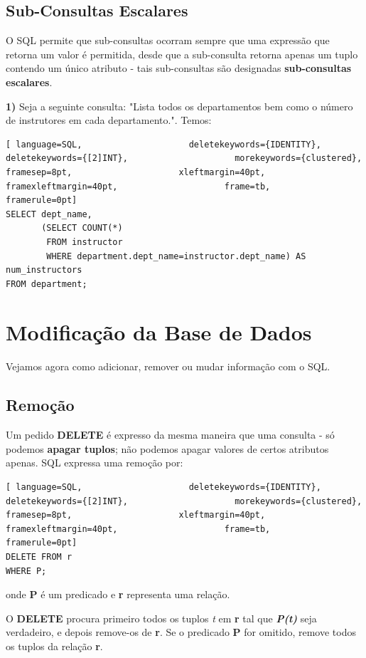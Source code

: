 \documentclass[titlepage]{book}
\theoremstyle{definition}
\begin{document}
\subsection{Sub-Consultas Escalares}
O SQL permite que sub-consultas ocorram sempre que uma expressão que retorna um valor é permitida, desde que a sub-consulta retorna apenas um tuplo contendo um único atributo - tais sub-consultas são designadas \textbf{sub-consultas escalares}.

\textbf{1)} Seja a seguinte consulta: "Lista todos os departamentos bem como o número de instrutores em cada departamento.". Temos:
\begin{lstlisting}[ language=SQL,                     deletekeywords={IDENTITY},                     deletekeywords={[2]INT},                     morekeywords={clustered},                     framesep=8pt,                     xleftmargin=40pt,                     framexleftmargin=40pt,                     frame=tb,                     framerule=0pt]
SELECT dept_name, 
       (SELECT COUNT(*)
        FROM instructor
        WHERE department.dept_name=instructor.dept_name) AS num_instructors
FROM department;
\end{lstlisting}

\section{Modificação da Base de Dados}
Vejamos agora como adicionar, remover ou mudar informação com o SQL.

\subsection{Remoção}
Um pedido \textbf{DELETE} é expresso da mesma maneira que uma consulta - só podemos \textbf{apagar tuplos}; não podemos apagar valores de certos atributos apenas. SQL expressa uma remoção por:

\begin{lstlisting}[ language=SQL,                     deletekeywords={IDENTITY},                     deletekeywords={[2]INT},                     morekeywords={clustered},                     framesep=8pt,                     xleftmargin=40pt,                     framexleftmargin=40pt,                     frame=tb,                     framerule=0pt]
DELETE FROM r
WHERE P;
\end{lstlisting}
onde \textbf{P} é um predicado e \textbf{r} representa uma relação.

O \textbf{DELETE} procura primeiro todos os tuplos \textit{t} em \textbf{r} tal que \textbf{\textit{P(t)}} seja verdadeiro, e depois remove-os de \textbf{r}. Se o predicado \textbf{P} for omitido, remove todos os tuplos da relação \textbf{r}.
\end{document}
